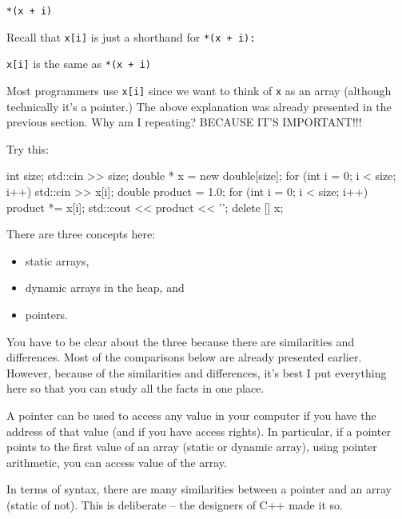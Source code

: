 \texttt{*(x + i)}

Recall that \texttt{x[i]} is just a shorthand for \texttt{*(x + i):}

\texttt{x[i]}         is the same as              \texttt{*(x + i)}

Most programmers use \texttt{x[i]} since we want to think of \texttt{x} as an array (although technically it's a pointer.) The above explanation was already presented in the previous section. Why am I repeating? BECAUSE IT'S IMPORTANT!!!

Try this:

\begin{consolethree}[escapeinside=||]
int size;
std::cin >> size;
double * x = new double[size];
for (int i = 0; i < size; i++)
{
    std::cin >> x[i];
}
double product = 1.0;
for (int i = 0; i < size; i++)
{
    product *= x[i];
    std::cout << product << '\n';
}
delete [] x;
\end{consolethree}





\newpage{}

There are three concepts here:

\begin{itemize}
\item static arrays,
\item dynamic arrays in the heap, and
\item pointers.
\end{itemize}

You have to be clear about the three because there are similarities and differences. Most of the comparisons below are already presented earlier. However, because of the similarities and differences, it's best I put everything here so that you can study all the facts in one place.

A pointer can be used to access any value in your computer if you have the address of that value (and if you have access rights). In particular, if a pointer points to the first value of an array (static or dynamic array), using pointer arithmetic, you can access value of the
array.

In terms of syntax, there are many similarities between a pointer and an array (static of not). This is deliberate -- the designers of C++ made it so.


